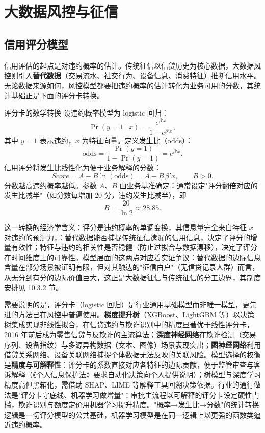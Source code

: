 \section{大数据风控与征信}

\subsection{信用评分模型}

信用评估的起点是对违约概率的估计。传统征信以信贷历史为核心数据，大数据风控则引入\textbf{替代数据}（交易流水、社交行为、设备信息、消费特征）推断信用水平。无论数据来源如何，风控模型都要把违约概率的估计转化为业务可用的分数，其统计基础正是下面的评分卡转换。

\begin{derivation}{评分卡的数学转换}{}
设违约概率模型为 logistic 回归：
\[
\Pr(y = 1 \mid x) = \frac{e^{\beta'x}}{1 + e^{\beta'x}},
\]
其中 $y = 1$ 表示违约，$x$ 为特征向量。定义发生比（odds）：
\[
\text{odds} = \frac{\Pr(y=1)}{1 - \Pr(y=1)} = e^{\beta'x}.
\]
信用评分将发生比线性化为便于业务解释的分数：
\[
Score = A - B \ln(\text{odds}) = A - B\,\beta'x, \qquad B > 0.
\]
分数越高违约概率越低。参数 $A$、$B$ 由业务基准确定：通常设定"评分翻倍对应的发生比减半"（如分数每增加 $20$ 分，违约发生比减半），即
\[
B = \frac{20}{\ln 2} \approx 28.85.
\]
\end{derivation}

这一转换的经济学含义：评分是违约概率的单调变换，其信息量完全来自特征 $x$ 对违约的预测力，：替代数据能否捕捉传统征信遗漏的信用信息，决定了评分的增量有效性；特征与违约的相关性是否稳健（防止过拟合与数据漂移），决定了评分在时间维度上的可靠性。模型层面的这两点对应着实证争议：替代数据的边际信息含量在部分场景被证明有限，但对其触达的"征信白户"（无信贷记录人群）而言，从无分到有分的边际价值巨大，这正是大数据征信与传统征信的分工边界，其制度安排见 10.3.2 节。

需要说明的是，评分卡（logistic 回归）是行业通用基础模型而非唯一模型，更先进的方法已在风控中普遍使用。\textbf{梯度提升树}（XGBoost、LightGBM 等）以决策树集成实现非线性拟合，在信贷违约与欺诈识别中的精度显著优于线性评分卡，2016 年前后成为零售信贷与反欺诈的主流算法；\textbf{深度神经网络}在欺诈检测（交易序列、设备指纹）与多源异构数据（文本、图像）场景表现突出；\textbf{图神经网络}利用借贷关系网络、设备关联网络捕捉个体数据无法反映的关联风险。模型选择的权衡是\textbf{精度与可解释性}：评分卡的系数直接对应各特征的边际贡献，便于监管审查与客诉解释（《个人信息保护法》要求自动化决策向个人提供说明）；树模型与深度学习精度高但黑箱化，需借助 SHAP、LIME 等解释工具回溯决策依据。行业的通行做法是"评分卡守底线、机器学习做增量"：审批主流程以可解释的评分卡设定硬性门槛，欺诈识别与额度定价用机器学习提升精度。"概率→发生比→分数"的统计转换逻辑是一切评分模型的公共基础，机器学习模型是在同一逻辑上以更强的函数类逼近违约概率。


